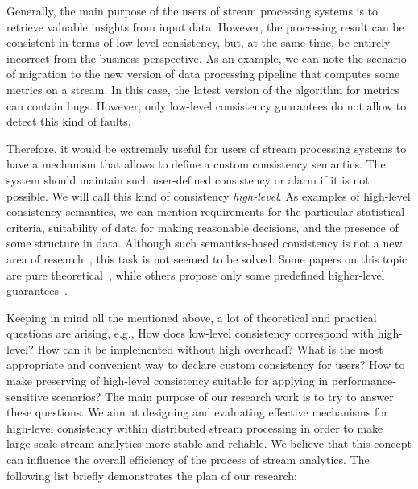 Generally, the main purpose of the users of stream processing systems is to retrieve valuable insights from input data. However, the processing result can be consistent in terms of low-level consistency, but, at the same time, be entirely incorrect from the business perspective. As an example, we can note the scenario of migration to the new version of data processing pipeline that computes some metrics on a stream. In this case, the latest version of the algorithm for metrics can contain bugs. However, only low-level consistency guarantees do not allow to detect this kind of faults.

Therefore, it would be extremely useful for users of stream processing systems to have a mechanism that allows to define a custom consistency semantics. The system should maintain such user-defined consistency or alarm if it is not possible. We will call this kind of consistency {\em high-level}. As examples of high-level consistency semantics, we can mention requirements for the particular statistical criteria, suitability of data for making reasonable decisions, and the presence of some structure in data. Although such semantics-based consistency is not a new area of research~\cite{Garcia-Molina:1983:USK:319983.319985}, this task is not seemed to be solved. Some papers on this topic are pure theoretical~\cite{Rodriguez:2008:ITA:1463434.1463480, Guo:2010:CMS:1822018.1822052}, while others propose only some predefined higher-level guarantees~\cite{Mihaila:2008:AIO:1458082.1458132, Fischer:2010:SSP:1739041.1739068}.

Keeping in mind all the mentioned above, a lot of theoretical and practical questions are arising, e.g., How does low-level consistency correspond with high-level? How can it be implemented without high overhead? What is the most appropriate and convenient way to declare custom consistency for users? How to make preserving of high-level consistency suitable for applying in performance-sensitive scenarios? The main purpose of our research work is to try to answer these questions. We aim at designing and evaluating effective mechanisms for high-level consistency within distributed stream processing in order to make large-scale stream analytics more stable and reliable. We believe that this concept can influence the overall efficiency of the process of stream analytics. The following list briefly demonstrates the plan of our research:

